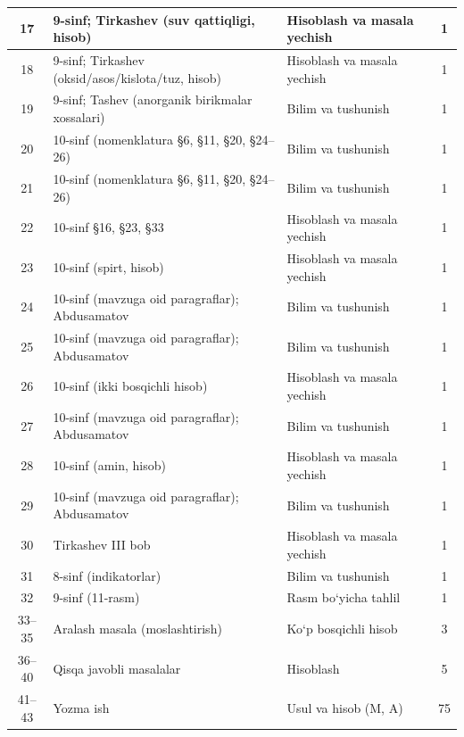 \documentclass[11pt,a4paper]{article}
\begin{document}
{\begin{longtable}{|c|p{7.2cm}|p{5.4cm}|c|}
17 & 9-sinf; Tirkashev (suv qattiqligi, hisob) & Hisoblash va masala yechish & 1\\\hline
18 & 9-sinf; Tirkashev (oksid/asos/kislota/tuz, hisob) & Hisoblash va masala yechish & 1\\\hline
19 & 9-sinf; Tashev (anorganik birikmalar xossalari) & Bilim va tushunish & 1\\\hline
20 & 10-sinf (nomenklatura \S{}6, \S{}11, \S{}20, \S{}24--26) & Bilim va tushunish & 1\\\hline
21 & 10-sinf (nomenklatura \S{}6, \S{}11, \S{}20, \S{}24--26) & Bilim va tushunish & 1\\\hline
22 & 10-sinf \S{}16, \S{}23, \S{}33 & Hisoblash va masala yechish & 1\\\hline
23 & 10-sinf (spirt, hisob) & Hisoblash va masala yechish & 1\\\hline
24 & 10-sinf (mavzuga oid paragraflar); Abdusamatov & Bilim va tushunish & 1\\\hline
25 & 10-sinf (mavzuga oid paragraflar); Abdusamatov & Bilim va tushunish & 1\\\hline
26 & 10-sinf (ikki bosqichli hisob) & Hisoblash va masala yechish & 1\\\hline
27 & 10-sinf (mavzuga oid paragraflar); Abdusamatov & Bilim va tushunish & 1\\\hline
28 & 10-sinf (amin, hisob) & Hisoblash va masala yechish & 1\\\hline
29 & 10-sinf (mavzuga oid paragraflar); Abdusamatov & Bilim va tushunish & 1\\\hline
30 & Tirkashev III bob & Hisoblash va masala yechish & 1\\\hline
31 & 8-sinf (indikatorlar) & Bilim va tushunish & 1\\\hline
32 & 9-sinf (11-rasm) & Rasm bo`yicha tahlil & 1\\\hline
33--35 & Aralash masala (moslashtirish) & Ko`p bosqichli hisob & 3\\\hline
36--40 & Qisqa javobli masalalar & Hisoblash & 5\\\hline
41--43 & Yozma ish & Usul va hisob (M, A) & 75\\\hline
\end{longtable}}
\end{document}
